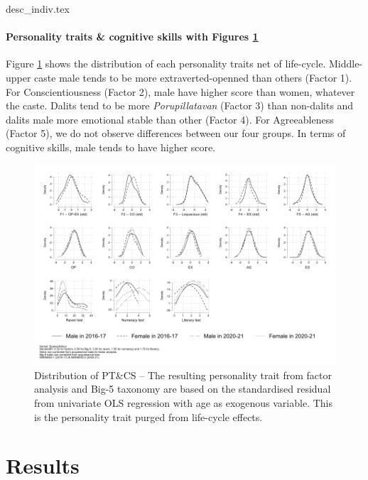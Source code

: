 \documentclass[a4paper, 11pt, onecolumn]{article}
\begin{document}
{desc_indiv.tex}

\paragraph{Personality traits \& cognitive skills with Figures \ref{fig:PTCS}}

Figure \ref{fig:PTCS} shows the distribution of each personality traits net of life-cycle.
Middle-upper caste male tends to be more extraverted-openned than others (Factor 1).
For Conscientiousness (Factor 2), male have higher score than women, whatever the caste.
Dalits tend to be more \textit{Porupillatavan} (Factor 3) than non-dalits
and dalits male more emotional stable than other (Factor 4).
For Agreeableness (Factor 5), we do not observe differences between our four groups.
In terms of cognitive skills, male tends to have higher score.


\begin{figure}[ht]
\raggedright
\includegraphics[width=\textwidth]{INPUT/Kernel_PTCS_raw}
\caption{Distribution of PT\&CS -- The resulting personality trait from factor analysis and Big-5 taxonomy are based on the standardised residual from univariate OLS regression with age as exogenous variable. This is the personality trait purged from life-cycle effects.}
\label{fig:PTCS}
\end{figure}



\newpage
\section{Results}
\end{document}
